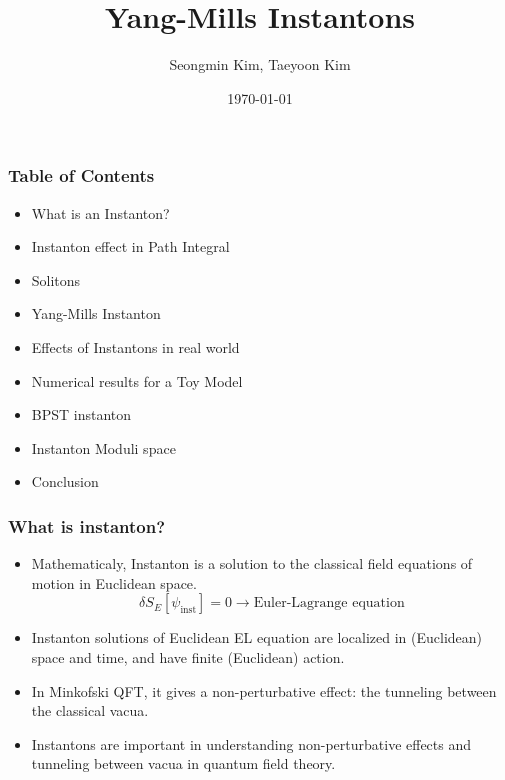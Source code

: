\documentclass[10pt]{beamer}
\title{Yang-Mills Instantons}
\author{Seongmin Kim, Taeyoon Kim}
\institute{SNU}
\date{\today}
\begin{document}
\frame{\titlepage}

\begin{frame}
\frametitle{Table of Contents}
\begin{itemize}
\item What is an Instanton?
\item Instanton effect in Path Integral
\item Solitons
\item Yang-Mills Instanton
\item Effects of Instantons in real world
\item Numerical results for a Toy Model
\item BPST instanton
\item Instanton Moduli space
\item Conclusion
\end{itemize}
\end{frame}

\begin{frame}
\frametitle{What is instanton?}
\begin{itemize}
\item Mathematicaly, Instanton is a solution to the classical field equations of motion in Euclidean space.
\begin{equation}
    \delta S_E [\psi_{\text{inst}}] = 0 \rightarrow \text{Euler-Lagrange equation}
\end{equation}
\item Instanton solutions of Euclidean EL equation are localized in (Euclidean) space and time, and have finite (Euclidean) action.
\item In Minkofski QFT, it gives a non-perturbative effect: the tunneling between the classical vacua.
\item Instantons are important in understanding non-perturbative effects and tunneling between vacua in quantum field theory.
\end{itemize}
\end{frame}
\end{document}
